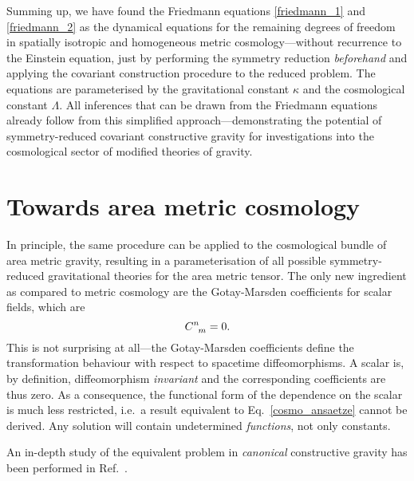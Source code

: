 Summing up, we have found the Friedmann equations \eqref{friedmann_1} and \eqref{friedmann_2} as the dynamical equations for the remaining degrees of freedom in spatially isotropic and homogeneous metric cosmology---without recurrence to the Einstein equation, just by performing the symmetry reduction \emph{beforehand} and applying the covariant construction procedure to the reduced problem. The equations are parameterised by the gravitational constant $\kappa$ and the cosmological constant $\Lambda$. All inferences that can be drawn from the Friedmann equations already follow from this simplified approach---demonstrating the potential of symmetry-reduced covariant constructive gravity for investigations into the cosmological sector of modified theories of gravity.

\normalfont
\section{Towards area metric cosmology}

In principle, the same procedure can be applied to the cosmological bundle of area metric gravity, resulting in a parameterisation of all possible symmetry-reduced gravitational theories for the area metric tensor. The only new ingredient as compared to metric cosmology are the Gotay-Marsden coefficients for scalar fields, which are
\begin{equation}
  \gmc{}{}{n}{m} = 0.
\end{equation}
This is not surprising at all---the Gotay-Marsden coefficients define the transformation behaviour with respect to spacetime diffeomorphisms. A scalar is, by definition, diffeomorphism \emph{invariant} and the corresponding coefficients are thus zero. As a consequence, the functional form of the dependence on the scalar is much less restricted, i.e.\ a result equivalent to Eq.~\eqref{cosmo_ansaetze} cannot be derived. Any solution will contain undetermined \emph{functions}, not only constants.

An in-depth study of the equivalent problem in \emph{canonical} constructive gravity has been performed in Ref.\ \cite{Duell_2020}.

